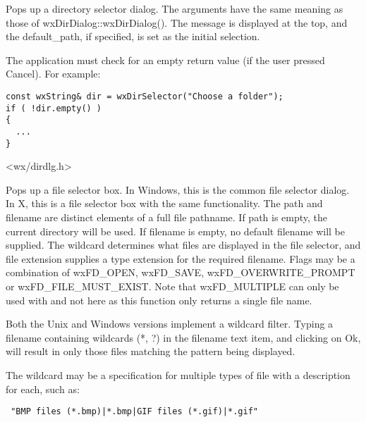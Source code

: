 Pops up a directory selector dialog. The arguments have the same meaning as
those of wxDirDialog::wxDirDialog(). The message is displayed at the top,
and the default\_path, if specified, is set as the initial selection.

The application must check for an empty return value (if the user pressed
Cancel). For example:

\begin{verbatim}
const wxString& dir = wxDirSelector("Choose a folder");
if ( !dir.empty() )
{
  ...
}
\end{verbatim}


<wx/dirdlg.h>


\label{wxfileselector}


Pops up a file selector box. In Windows, this is the common file selector
dialog. In X, this is a file selector box with the same functionality.
The path and filename are distinct elements of a full file pathname.
If path is empty, the current directory will be used. If filename is empty,
no default filename will be supplied. The wildcard determines what files
are displayed in the file selector, and file extension supplies a type
extension for the required filename. Flags may be a combination of wxFD\_OPEN,
wxFD\_SAVE, wxFD\_OVERWRITE\_PROMPT or wxFD\_FILE\_MUST\_EXIST. Note that wxFD\_MULTIPLE
can only be used with  and not here as this
function only returns a single file name.

Both the Unix and Windows versions implement a wildcard filter. Typing a
filename containing wildcards (*, ?) in the filename text item, and
clicking on Ok, will result in only those files matching the pattern being
displayed.

The wildcard may be a specification for multiple types of file
with a description for each, such as:

\begin{verbatim}
 "BMP files (*.bmp)|*.bmp|GIF files (*.gif)|*.gif"
\end{verbatim}

